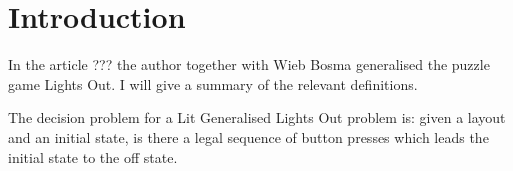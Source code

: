 \section{Introduction}

In the article ??? the author together with Wieb Bosma generalised the
puzzle game Lights Out. I will give a summary of the relevant
definitions.

The decision problem for a Lit Generalised Lights Out problem is: given
a layout and an initial state, is there a legal sequence of button
presses which leads the initial state to the off state.

